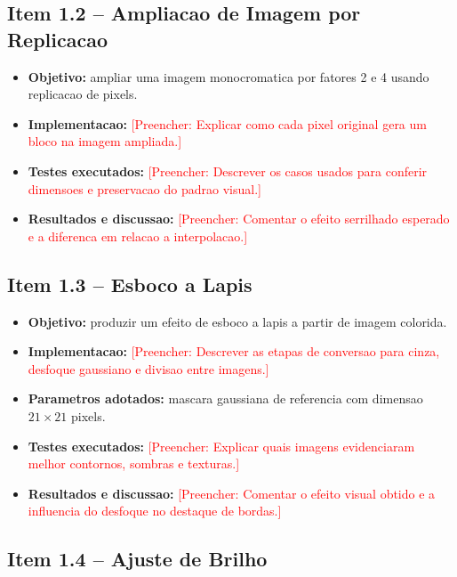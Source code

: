 \documentclass[12pt,a4paper]{article}
\newcommand{\placeholder}[1]{\textcolor{red}{[Preencher: #1]}}
\begin{document}
\subsection{Item 1.2 -- Ampliacao de Imagem por Replicacao}

\begin{itemize}[leftmargin=*]
  \item \textbf{Objetivo:} ampliar uma imagem monocromatica por fatores 2 e 4 usando replicacao de pixels.
  \item \textbf{Implementacao:} \placeholder{Explicar como cada pixel original gera um bloco na imagem ampliada.}
  \item \textbf{Testes executados:} \placeholder{Descrever os casos usados para conferir dimensoes e preservacao do padrao visual.}
  \item \textbf{Resultados e discussao:} \placeholder{Comentar o efeito serrilhado esperado e a diferenca em relacao a interpolacao.}
\end{itemize}

\subsection{Item 1.3 -- Esboco a Lapis}

\begin{itemize}[leftmargin=*]
  \item \textbf{Objetivo:} produzir um efeito de esboco a lapis a partir de imagem colorida.
  \item \textbf{Implementacao:} \placeholder{Descrever as etapas de conversao para cinza, desfoque gaussiano e divisao entre imagens.}
  \item \textbf{Parametros adotados:} mascara gaussiana de referencia com dimensao $21 \times 21$ pixels.
  \item \textbf{Testes executados:} \placeholder{Explicar quais imagens evidenciaram melhor contornos, sombras e texturas.}
  \item \textbf{Resultados e discussao:} \placeholder{Comentar o efeito visual obtido e a influencia do desfoque no destaque de bordas.}
\end{itemize}

\subsection{Item 1.4 -- Ajuste de Brilho}
\end{document}
